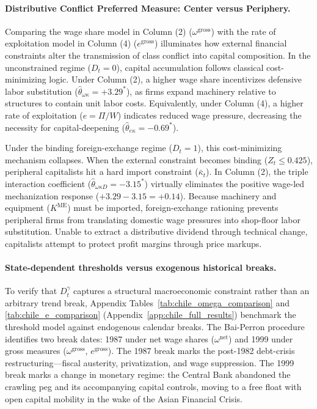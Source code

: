 \paragraph{Distributive Conflict Preferred Measure: Center versus Periphery.} Comparing the wage share model in Column (2) ($\omega^{\text{gross}}$) with the rate of exploitation model in Column (4) ($e^{\text{gross}}$) illuminates how external financial constraints alter the transmission of class conflict into capital composition. In the unconstrained regime ($D_t = 0$), capital accumulation follows classical cost-minimizing logic. Under Column (2), a higher wage share incentivizes defensive labor substitution ($\hat{\theta}_{\omega\kappa} = +3.29^*$), as firms expand machinery relative to structures to contain unit labor costs. Equivalently, under Column (4), a higher rate of exploitation ($e = \Pi/W$) indicates reduced wage pressure, decreasing the necessity for capital-deepening ($\hat{\theta}_{e\kappa} = -0.69^*$).

Under the binding foreign-exchange regime ($D_t = 1$), this cost-minimizing mechanism collapses. When the external constraint becomes binding ($Z_t \le 0.425$), peripheral capitalists hit a hard import constraint ($\bar{\kappa}_t$). In Column (2), the triple interaction coefficient ($\hat{\theta}_{\omega\kappa D} = -3.15^*$) virtually eliminates the positive wage-led mechanization response ($+3.29 - 3.15 = +0.14$). Because machinery and equipment ($K^{\text{ME}}$) must be imported, foreign-exchange rationing prevents peripheral firms from translating domestic wage pressures into shop-floor labor substitution. Unable to extract a distributive dividend through technical change, capitalists attempt to protect profit margins through price markups.

\paragraph{State-dependent thresholds versus exogenous historical breaks.} To verify that $D_t^\gamma$ captures a structural macroeconomic constraint rather than an arbitrary trend break, Appendix Tables~\ref{tab:chile_omega_comparison} and \ref{tab:chile_e_comparison} (Appendix~\ref{app:chile_full_results}) benchmark the threshold model against \citet{BaiPerron2003} endogenous calendar breaks. The Bai-Perron procedure identifies two break dates: 1987 under net wage shares ($\omega^{\text{net}}$) and 1999 under gross measures ($\omega^{\text{gross}}$, $e^{\text{gross}}$). The 1987 break marks the post-1982 debt-crisis restructuring---fiscal austerity, privatization, and wage suppression. The 1999 break marks a change in monetary regime: the Central Bank abandoned the crawling peg and its accompanying capital controls, moving to a free float with open capital mobility in the wake of the Asian Financial Crisis.


